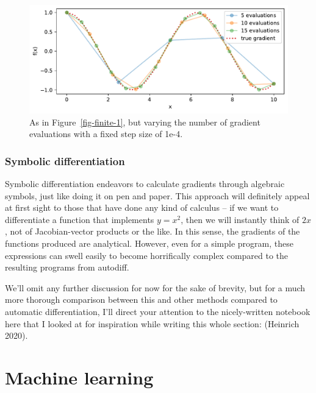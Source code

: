 \documentclass[
  11pt,
  numbers=noendperiod]{book}
\begin{document}
\begin{figure}

{\centering \includegraphics{./autodiff_files/figure-pdf/fig-finite-2-output-1.pdf}

}

\caption{\label{fig-finite-2}As in Figure~\ref{fig-finite-1}, but
varying the number of gradient evaluations with a fixed step size of
1e-4.}

\end{figure}

\hypertarget{symbolic-differentiation}{%
\subsection{Symbolic differentiation}\label{symbolic-differentiation}}

Symbolic differentiation endeavors to calculate gradients through
algebraic symbols, just like doing it on pen and paper. This approach
will definitely appeal at first sight to those that have done any kind
of calculus -- if we want to differentiate a function that implements
\(y = x^2\), then we will instantly think of \(2x\), not of
Jacobian-vector products or the like. In this sense, the gradients of
the functions produced are analytical. However, even for a simple
program, these expressions can swell easily to become horrifically
complex compared to the resulting programs from autodiff.

We'll omit any further discussion for now for the sake of brevity, but
for a much more thorough comparison between this and other methods
compared to automatic differentiation, I'll direct your attention to the
nicely-written notebook here that I looked at for inspiration while
writing this whole section: (Heinrich 2020).

\hypertarget{machine-learning}{%
\chapter{Machine learning}\label{machine-learning}}
\end{document}
